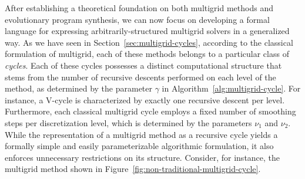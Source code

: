 After establishing a theoretical foundation on both multigrid methods and evolutionary program synthesis, we can now focus on developing a formal language for expressing arbitrarily-structured multigrid solvers in a generalized way.
As we have seen in Section~\ref{sec:multigrid-cycles}, according to the classical formulation of multigrid, each of these methods belongs to a particular class of \emph{cycles}.
Each of these cycles possesses a distinct computational structure that stems from the number of recursive descents performed on each level of the method, as determined by the parameter $\gamma$ in Algorithm~\ref{alg:multigrid-cycle}.
For instance, a V-cycle is characterized by exactly one recursive descent per level.
Furthermore, each classical multigrid cycle employs a fixed number of smoothing steps per discretization level, which is determined by the parameters $\nu_1$ and $\nu_2$.
While the representation of a multigrid method as a recursive cycle yields a formally simple and easily parameterizable algorithmic formulation, it also enforces unnecessary restrictions on its structure.
Consider, for instance, the multigrid method shown in Figure~\ref{fig:non-traditional-multigrid-cycle}.
